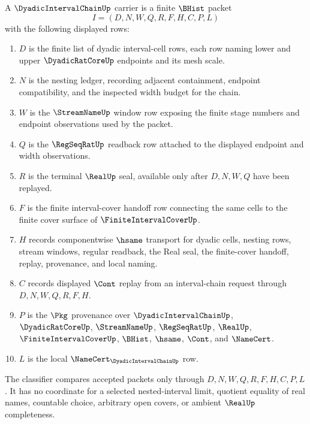 \begin{definition}
\label{def:dyadic-interval-chain-carrier}
A $\DyadicIntervalChainUp$ carrier is a finite $\BHist$ packet
$$
I=(D,N,W,Q,R,F,H,C,P,L)
$$
with the following displayed rows:
\begin{enumerate}
\item $D$ is the finite list of dyadic interval-cell rows, each row naming lower and upper $\DyadicRatCoreUp$ endpoints and its mesh scale.
\item $N$ is the nesting ledger, recording adjacent containment, endpoint compatibility, and the inspected width budget for the chain.
\item $W$ is the $\StreamNameUp$ window row exposing the finite stage numbers and endpoint observations used by the packet.
\item $Q$ is the $\RegSeqRatUp$ readback row attached to the displayed endpoint and width observations.
\item $R$ is the terminal $\RealUp$ seal, available only after $D,N,W,Q$ have been replayed.
\item $F$ is the finite interval-cover handoff row connecting the same cells to the finite cover surface of $\FiniteIntervalCoverUp$.
\item $H$ records componentwise $\hsame$ transport for dyadic cells, nesting rows, stream windows, regular readback, the Real seal, the finite-cover handoff, replay, provenance, and local naming.
\item $C$ records displayed $\Cont$ replay from an interval-chain request through $D,N,W,Q,R,F,H$.
\item $P$ is the $\Pkg$ provenance over $\DyadicIntervalChainUp$, $\DyadicRatCoreUp$, $\StreamNameUp$, $\RegSeqRatUp$, $\RealUp$, $\FiniteIntervalCoverUp$, $\BHist$, $\hsame$, $\Cont$, and $\NameCert$.
\item $L$ is the local $\NameCert_{\DyadicIntervalChainUp}$ row.
\end{enumerate}
The classifier compares accepted packets only through $D,N,W,Q,R,F,H,C,P,L$. It has no coordinate for a selected nested-interval limit, quotient equality of real names, countable choice, arbitrary open covers, or ambient $\RealUp$ completeness.
\end{definition}

